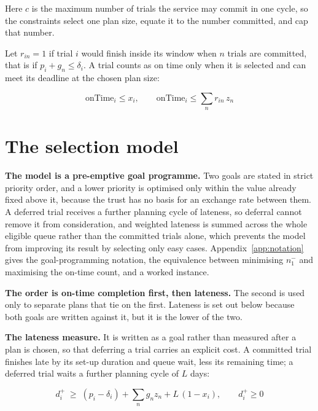 Here $c$ is the maximum number of trials the service may commit in one cycle, so the constraints select one plan size, equate it to the number committed, and cap that number.

Let $r_{in} = 1$ if trial $i$ would finish inside its window when $n$ trials are committed, that is if $p_i + g_n \le \delta_i$. A trial counts as on time only when it is selected and can meet its deadline at the chosen plan size:

\begin{equation}
  \mathrm{onTime}_i \le x_i, \qquad \mathrm{onTime}_i \le \sum_n r_{in}\, z_n
  \label{eq:ontime}
\end{equation}

\section{The selection model}
\label{sec:model}

\textbf{The model is a pre-emptive goal programme.} Two goals are stated in strict priority order, and a lower priority is optimised only within the value already fixed above it, because the trust has no basis for an exchange rate between them. A deferred trial receives a further planning cycle of lateness, so deferral cannot remove it from consideration, and weighted lateness is summed across the whole eligible queue rather than the committed trials alone, which prevents the model from improving its result by selecting only easy cases. Appendix~\ref{app:notation} gives the goal-programming notation, the equivalence between minimising $n_1^-$ and maximising the on-time count, and a worked instance.

\textbf{The order is on-time completion first, then lateness.} The second is used only to separate plans that tie on the first. Lateness is set out below because both goals are written against it, but it is the lower of the two.

\textbf{The lateness measure.} It is written as a goal rather than measured after a plan is chosen, so that deferring a trial carries an explicit cost. A committed trial finishes late by its set-up duration and queue wait, less its remaining time; a deferred trial waits a further planning cycle of $L$ days:

\begin{equation}
  d^+_i \;\ge\; (p_i - \delta_i) + \sum_n g_n z_n + L\,(1 - x_i), \qquad d^+_i \ge 0
  \label{eq:lateness}
\end{equation}

